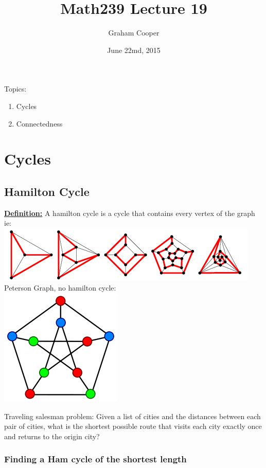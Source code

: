 \documentclass[12pt]{article}
\title{\vspace{-15ex}Math239 Lecture 19\vspace{-1ex}}
\date{June 22md, 2015}
\author{Graham Cooper}
\newcommand{\myt}[1]{\textbf{\underline{#1}}}
\begin{document}
	\maketitle
	Topics:
	\begin{enumerate}
		\item Cycles
		\item Connectedness
	\end{enumerate}
	
	\section*{Cycles}
	
	\subsection*{Hamilton Cycle}
	
	\myt{Definition:} A hamilton cycle is a cycle that contains every vertex of the graph\\
	
	ie:\\
	\includegraphics[scale=0.5]{hamilton1.png}\\
	
	Peterson Graph, no hamilton cycle:\\
	\includegraphics[scale=0.5]{peterson.png}
	
	Traveling salesman problem: Given a list of cities and the distances between each pair of cities, what is the shortest possible route that visits each city exactly once and returns to the origin city?\\
	
	\subsubsection*{Finding a Ham cycle of the shortest length}
	
\end{document}
